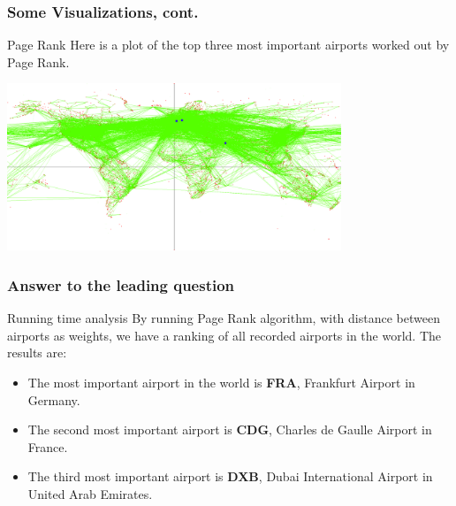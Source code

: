 \documentclass{beamer}
\begin{document}
\begin{frame}
\frametitle{Some Visualizations, cont.}
\begin{block}{Page Rank}
    Here is a plot of the top three most important airports worked out by Page Rank.
    \begin{center}
        \includegraphics[width=10cm]{plots/top-three.png}
    \end{center}
    
\end{block}
\end{frame}

\begin{frame}
\frametitle{Answer to the leading question}
\begin{block}{Running time analysis}
    By running Page Rank algorithm, with distance between airports as weights, we have a ranking of all recorded airports in the world. The results are:
    \begin{itemize}
        \item The most important airport in the world is \textbf{FRA}, Frankfurt Airport in Germany.
        \item The second most important airport is \textbf{CDG}, Charles de Gaulle Airport in France.
        \item The third most important airport is \textbf{DXB}, Dubai International Airport in United Arab Emirates.
    \end{itemize}
\end{block}
\end{frame}
\end{document}
